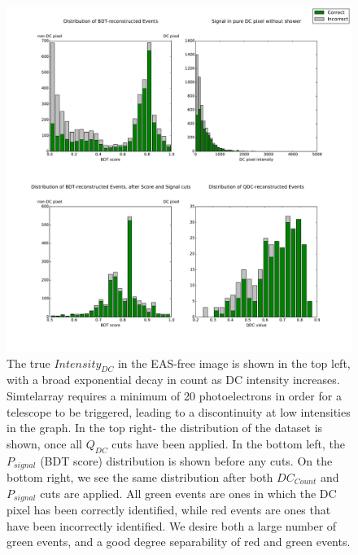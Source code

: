 \documentclass[]{article}
\begin{document}
\begin{figure}
\begin{center}
\includegraphics[width=\textwidth]{cutdistribution1None}
\caption{The true $Intensity_{DC}$ in the EAS-free image is shown in the top left, with a broad exponential decay in count as DC intensity increases. Sim\textunderscore telarray requires a minimum of 20 photoelectrons in order for a telescope to be triggered, leading to a discontinuity at low intensities in the graph.  In the top right- the distribution of the dataset is shown, once all $Q_{DC}$ cuts have been applied. In the bottom left, the $P_{signal}$ (BDT score) distribution is shown before any cuts. On the bottom right, we see the same distribution after both $DC_{Count}$ and $P_{signal}$ cuts are applied. All green events are ones in which the DC pixel has been correctly identified, while red events are ones that have been incorrectly identified. We desire both a large number of green events, and a good degree separability of red and green events.}
\label{fig:cutdistribution}
\end{center}
\end{figure}
\end{document}
